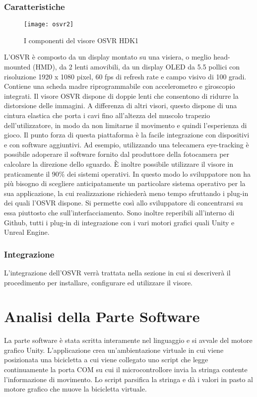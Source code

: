\subsubsection{Caratteristiche}

\begin{wrapfigure}{r}{0.5\textwidth} %
    \centering
    \vspace{-0.5cm}
    \texttt{[image: osvr2]}
    \caption{I componenti del visore OSVR HDK1}
    \vspace{-0.3cm}
\end{wrapfigure}
L'OSVR è composto da un display montato su una visiera, o meglio head-mounted (HMD), da 2 lenti amovibili, da un display OLED da 5.5 pollici con risoluzione 1920 x 1080 pixel, 60 fps di refresh rate e campo visivo di 100 gradi. Contiene una scheda madre riprogrammabile con accelerometro e giroscopio integrati. Il visore OSVR dispone di doppie lenti che consentono di ridurre la distorsione delle immagini. A differenza di altri visori, questo dispone di una cintura elastica che porta i cavi fino all'altezza del muscolo trapezio dell'utilizzatore, in modo da non limitarne il movimento e quindi l'esperienza di gioco.
Il punto forza di questa piattaforma è la facile integrazione con dispositivi e con software aggiuntivi. Ad esempio, utilizzando una telecamera eye-tracking è possibile adoperare il software fornito dal produttore della fotocamera per calcolare la direzione dello sguardo. È inoltre possibile utilizzare il visore in praticamente il 90\% dei sistemi operativi.
In questo modo lo sviluppatore non ha più bisogno di scegliere anticipatamente un particolare sistema operativo per la sua applicazione, la cui realizzazione richiederà meno tempo sfruttando i plug-in dei quali l'OSVR dispone. Si permette così allo sviluppatore di concentrarsi su essa piuttosto che sull'interfacciamento.
 Sono inoltre reperibili all'interno di Github, tutti i plug-in di integrazione con i vari motori grafici quali Unity e Unreal Engine.
\subsubsection{Integrazione}
L'integrazione dell'OSVR verrà trattata nella sezione \textit{} in cui si descriverà il procedimento per installare, configurare ed utilizzare il visore.

\section{Analisi della Parte Software}
\label{software}
La parte software è stata scritta interamente nel linguaggio \Csharp\: e si avvale del motore grafico Unity. L'applicazione crea un'ambientazione virtuale in cui viene posizionata una bicicletta a cui viene collegato uno script che legge continuamente la porta COM su cui il microcontrollore invia la stringa contente l'informazione di movimento. Lo script parsifica la stringa e dà i valori in pasto al motore grafico che muove la bicicletta virtuale.
